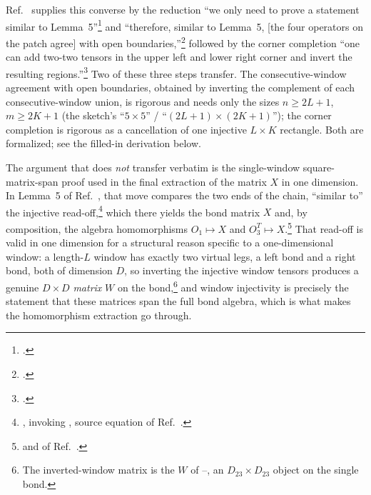 \documentclass{article}
\begin{document}
Ref.~\cite{Molnar2018NormalPEPS} supplies this converse by the reduction ``we only need to prove a
statement similar to Lemma~5''\footnote{.}
and ``therefore, similar to Lemma~5, [the four operators on the patch
        agree] with open boundaries,''\footnote{.}
followed by the corner completion ``one can add two-two tensors in the upper
left and lower right corner and invert the resulting
regions.''\footnote{.} Two of
these three steps transfer. The consecutive-window agreement with open
boundaries, obtained by inverting the complement of each consecutive-window
union, is rigorous and needs only the sizes $n \geq 2L+1$, $m \geq 2K+1$ (the
sketch's ``$5\times5$'' / ``$(2L+1)\times(2K+1)$''); the corner completion is
rigorous as a cancellation of one injective $L \times K$ rectangle. Both are
formalized; see the filled-in derivation below.

The argument that does \emph{not} transfer verbatim is the single-window
square-matrix-span proof used in the final extraction of the matrix $X$ in one
dimension. In Lemma~5 of Ref.~\cite{Molnar2018NormalPEPS}, that move compares the
two ends of the chain, ``similar to'' the injective read-off,\footnote{, invoking
    , source equation
     of Ref.~\cite{Molnar2018NormalPEPS}.} which there yields the bond matrix $X$ and,
by composition, the algebra
homomorphisms $O_1 \mapsto X$ and
$O_3^T \mapsto X$.\footnote{ and
     of
    Ref.~\cite{Molnar2018NormalPEPS}.} That read-off is valid in
one dimension for a structural reason specific to a one-dimensional window:
a length-$L$ window has exactly two virtual legs, a left bond and a right
bond, both of dimension $D$, so inverting the injective window tensors
produces a genuine $D \times D$ \emph{matrix} $W$ on the bond,\footnote{The
    inverted-window matrix is the $W$ of
    --, an
    $D_{23} \times D_{23}$ object on the single bond.} and window injectivity is
precisely the statement that these matrices span the full bond algebra, which
is what makes the homomorphism extraction go through.
\end{document}
